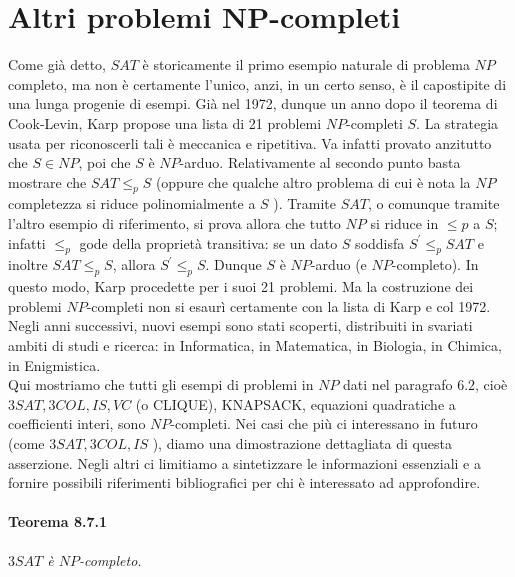 \section{Altri problemi NP-completi}

Come già detto, $S A T$ è storicamente il primo esempio naturale di problema $N
    P$ completo, ma non è certamente l'unico, anzi, in un certo senso, è il
capostipite di una lunga progenie di esempi. Già nel 1972, dunque un anno dopo
il teorema di Cook-Levin, Karp propose una lista di 21 problemi $N P$-completi
$S$. La strategia usata per riconoscerli tali è meccanica e ripetitiva. Va
infatti provato anzitutto che $S \in N P$, poi che $S$ è $N P$-arduo.
Relativamente al secondo punto basta mostrare che $S A T \leq_p S$ (oppure che
qualche altro problema di cui è nota la $N P$ completezza si riduce
polinomialmente a $S$ ). Tramite $S A T$, o comunque tramite l'altro esempio di
riferimento, si prova allora che tutto $N P$ si riduce in $\leq p$ a $S$;
infatti $\leq_p$ gode della proprietà transitiva: se un dato $S$ soddisfa
$S^{\prime} \leq_p S A T$ e inoltre $S A T \leq_p S$, allora $S^{\prime} \leq_p
    S$. Dunque $S$ è $N P$-arduo (e $N P$-completo). In questo modo, Karp procedette
per i suoi 21 problemi. Ma la costruzione dei problemi $N P$-completi non si
esaurì certamente con la lista di Karp e col 1972. Negli anni successivi, nuovi
esempi sono stati scoperti, distribuiti in svariati ambiti di studi e ricerca:
in Informatica, in Matematica, in Biologia, in Chimica, in Enigmistica.\\

Qui mostriamo che tutti gli esempi di problemi in $N P$ dati nel paragrafo $6.2$, cioè $3 S A T, 3 C O L, I S, V C$ (o CLIQUE), KNAPSACK, equazioni quadratiche a coefficienti interi, sono $N P$-completi. Nei casi che più ci interessano in futuro (come $3 S A T, 3 C O L, I S$ ), diamo una dimostrazione dettagliata di questa asserzione. Negli altri ci limitiamo a sintetizzare le informazioni essenziali e a fornire possibili riferimenti bibliografici per chi è interessato ad approfondire.

\paragraph{Teorema 8.7.1} \textit{$3 S A T$ è $N P$-completo.}


